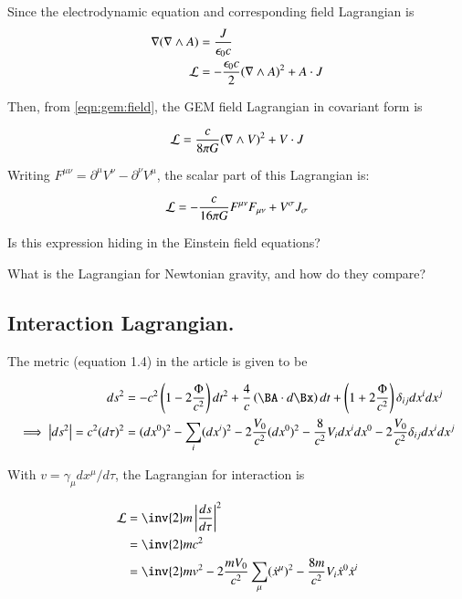 Since the electrodynamic equation and corresponding field Lagrangian is
\begin{align*}
\nabla (\nabla \wedge A) &= \frac{J}{\epsilon_0 c} \\
\mathcal{L} &= -\frac{\epsilon_0 c}{2} (\nabla \wedge A)^2 + A \cdot J
\end{align*}

Then, from \ref{eqn:gem:field}, the GEM field Lagrangian in covariant form is

\begin{align*}
\mathcal{L} &= \frac{c}{8 \pi G} (\nabla \wedge V)^2 + V \cdot J \\
\end{align*}

Writing $F^{\mu\nu} = \partial^\mu V^\nu - \partial^\nu V^\mu$, the scalar part of this Lagrangian is:

\begin{align*}
\mathcal{L} &= -\frac{c}{16 \pi G} F^{\mu\nu} F_{\mu\nu} + V^\sigma J_\sigma \\
\end{align*}

Is this expression hiding in the Einstein field equations?

What is the Lagrangian for Newtonian gravity, and how do they compare?

\subsection{Interaction Lagrangian. }

The metric (equation 1.4) in the article is given to be

\begin{align*}
ds^2 &= 
-c^2\left(1 - 2 \frac{\Phi}{c^2}\right) dt^2
+\frac{4}{c}\left(\BA \cdot d\Bx \right) dt 
+\left(1 + 2 \frac{\Phi}{c^2}\right) \delta_{ij}dx^i dx^j \\
\implies
\Abs{ds^2} = c^2 (d\tau)^2 &= (dx^0)^2 - \sum_i (dx^i)^2
-2 \frac{V_0}{c^2} (dx^0)^2
-\frac{8}{c^2} V_i dx^i dx^0
- 2 \frac{V_0}{c^2} \delta_{ij}dx^i dx^j
\end{align*}

With $v = \gamma_\mu dx^\mu/d\tau$, the Lagrangian for interaction is

\begin{align*}
\LL 
&= \inv{2} m \Abs{\frac{ds}{d\tau}}^2  \\
&= \inv{2} m c^2 \\
&= \inv{2} m v^2 -2 \frac{m V_0}{c^2} \sum_\mu (\xdot^\mu)^2 -\frac{8 m}{c^2} V_i \xdot^0 \xdot^i  \\
\end{align*}

